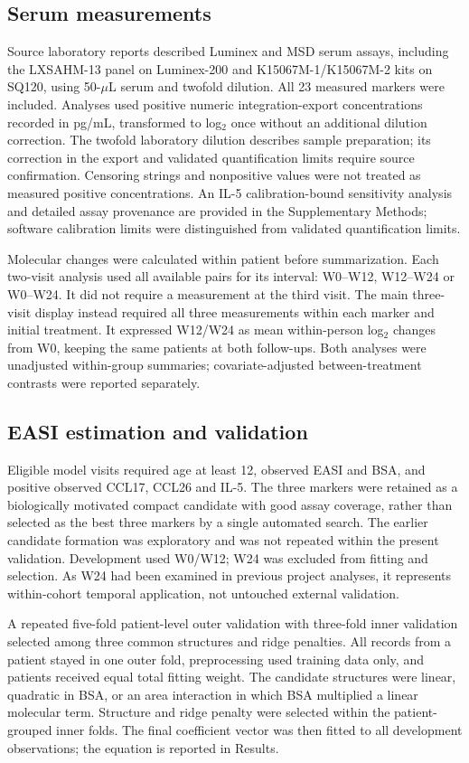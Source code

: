 \documentclass[10pt,a4paper]{article}
\begin{document}
\subsection{Serum measurements}
Source laboratory reports described Luminex and MSD serum assays, including the LXSAHM-13 panel on Luminex-200 and K15067M-1/K15067M-2 kits on SQ120, using 50-$\mu$L serum and twofold dilution. All 23 measured markers were included. Analyses used positive numeric integration-export concentrations recorded in pg/mL, transformed to log$_2$ once without an additional dilution correction. The twofold laboratory dilution describes sample preparation; its correction in the export and validated quantification limits require source confirmation. Censoring strings and nonpositive values were not treated as measured positive concentrations. An IL-5 calibration-bound sensitivity analysis and detailed assay provenance are provided in the Supplementary Methods; software calibration limits were distinguished from validated quantification limits.

Molecular changes were calculated within patient before summarization. Each two-visit analysis used all available pairs for its interval: W0--W12, W12--W24 or W0--W24. It did not require a measurement at the third visit. The main three-visit display instead required all three measurements within each marker and initial treatment. It expressed W12/W24 as mean within-person log$_2$ changes from W0, keeping the same patients at both follow-ups. Both analyses were unadjusted within-group summaries; covariate-adjusted between-treatment contrasts were reported separately.

\subsection{EASI estimation and validation}
Eligible model visits required age at least 12, observed EASI and BSA, and positive observed CCL17, CCL26 and IL-5. The three markers were retained as a biologically motivated compact candidate with good assay coverage, rather than selected as the best three markers by a single automated search. The earlier candidate formation was exploratory and was not repeated within the present validation. Development used W0/W12; W24 was excluded from fitting and selection. As W24 had been examined in previous project analyses, it represents within-cohort temporal application, not untouched external validation.

A repeated five-fold patient-level outer validation with three-fold inner validation selected among three common structures and ridge penalties. All records from a patient stayed in one outer fold, preprocessing used training data only, and patients received equal total fitting weight. The candidate structures were linear, quadratic in BSA, or an area interaction in which BSA multiplied a linear molecular term. Structure and ridge penalty were selected within the patient-grouped inner folds. The final coefficient vector was then fitted to all development observations; the equation is reported in Results.
\end{document}
